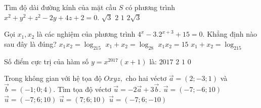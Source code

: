 \begin{ex}%
Tìm độ dài đường kính của mặt cầu $S$ có phương trình $x^2+y^2+z^2-2y+4z+2=0$.
\choice
{$\sqrt{3}$}
{$2$}
{$1$}
{\True $2\sqrt{3}$}
\end{ex}
\begin{ex}%
Gọi $x_1,x_2$ là các nghiệm của phương trình $4^x-{3.2}^{x+3}+15=0$. Khẳng định nào sau đây là đúng?
\choice
{$x_1x_2=\log_215$}
{$x_1+x_2=\log_28$}
{$x_1x_2=15$}
{\True $x_1+x_2=\log_215$}
\end{ex}
\begin{ex}%
Số điểm cực trị của hàm số $y=x^{2017}\left(x+1\right)$ là:
\choice
{$2017$}
{$2$}
{\True $1$}
{$0$}
\end{ex}
\begin{ex}%
Trong không gian với hệ tọa độ $Oxyz,$ cho hai véctơ $\overrightarrow{a}=(2;-3;1)$ và $\overrightarrow{b}=(-1;0;4)$. Tìm tọa độ véctơ $\overrightarrow{u}=-2\overrightarrow{a}+3\overrightarrow{b}$.
\choice
{$\overrightarrow{u}=(-7;-6;10)$}
{\True $\overrightarrow{u}=(-7;6;10)$}
{$\overrightarrow{u}=(7;6;10)$}
{$\overrightarrow{u}=(-7;6;-10)$}
\end{ex}
